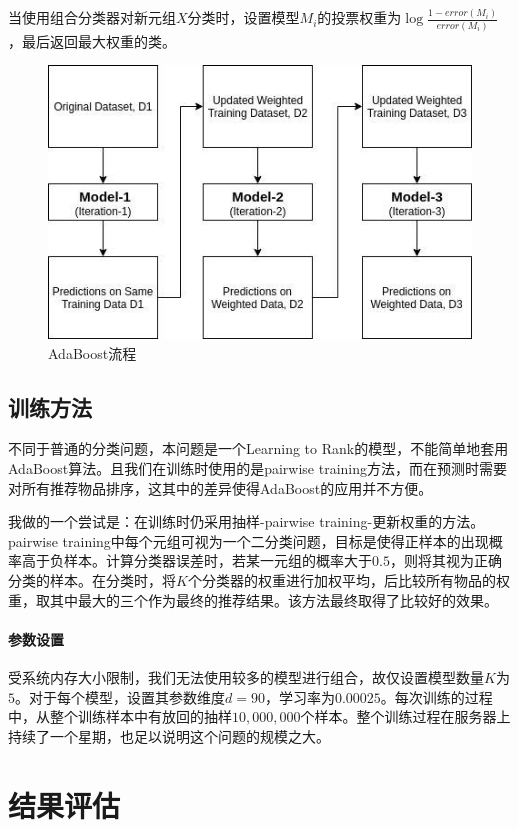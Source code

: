 \documentclass[12pt]{article} %
\newcommand\XX{\boldsymbol{\mathit{X}}}
\begin{document}
\begin{sloppypar}
当使用组合分类器对新元组$\XX$分类时，设置模型$M_i$的投票权重为$\log\frac{1-error(M_i)}{error(M_i)}$，最后返回最大权重的类。

\begin{figure}[htbp]
	\centering
	\includegraphics[width=0.85\linewidth]{figure/AdaBoost.jpg}
	\caption{AdaBoost流程}
	\label{fig:AdaBoost}
\end{figure}

\subsection{训练方法}

不同于普通的分类问题，本问题是一个Learning to Rank的模型，不能简单地套用AdaBoost算法。且我们在训练时使用的是pairwise training方法，而在预测时需要对所有推荐物品排序，这其中的差异使得AdaBoost的应用并不方便。

我做的一个尝试是：在训练时仍采用抽样-pairwise training-更新权重的方法。pairwise training中每个元组可视为一个二分类问题，目标是使得正样本的出现概率高于负样本。计算分类器误差时，若某一元组的概率大于$0.5$，则将其视为正确分类的样本。在分类时，将$K$个分类器的权重进行加权平均，后比较所有物品的权重，取其中最大的三个作为最终的推荐结果。该方法最终取得了比较好的效果。

\paragraph{参数设置}
受系统内存大小限制，我们无法使用较多的模型进行组合，故仅设置模型数量$K$为$5$。对于每个模型，设置其参数维度$d=90$，学习率为$0.00025$。每次训练的过程中，从整个训练样本中有放回的抽样$10,000,000$个样本。整个训练过程在服务器上持续了一个星期，也足以说明这个问题的规模之大。


\newpage
\section{结果评估}


\end{sloppypar}
\end{document}
